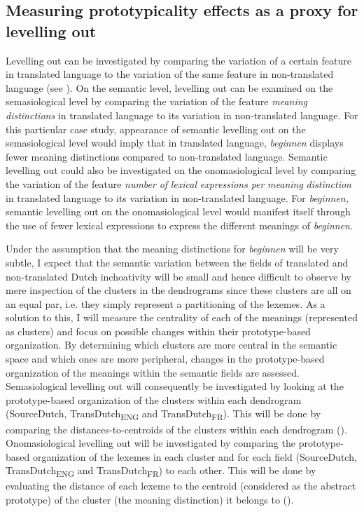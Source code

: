 \subsection{Measuring prototypicality effects as a proxy for levelling out}
\label{sec:3.8.1}
Levelling out can be investigated by comparing the variation of a certain feature in translated language to the variation of the same feature in non-translated language (see ). On the semantic level, levelling out can be examined on the semasiological level by comparing the variation of the feature \textit{meaning} \textit{distinctions} in translated language to its variation in non-translated language. For this particular case study, appearance of semantic levelling out on the semasiological level would imply that in translated language, \textit{beginnen} displays fewer meaning distinctions compared to non-translated language. Semantic levelling out could also be investigated on the onomasiological level by comparing the variation of the feature \textit{number} \textit{of} \textit{lexical} \textit{expressions} \textit{per} \textit{meaning} \textit{distinction} in translated language to its variation in non-translated language. For \textit{beginnen,} semantic levelling out on the onomasiological level would manifest itself through the use of fewer lexical expressions to express the different meanings of \textit{beginnen}.

Under the assumption that the meaning distinctions for \textit{beginnen} will be very subtle, I expect that the semantic variation between the fields of translated and non-translated Dutch inchoativity will be small and hence difficult to observe by mere inspection of the clusters in the dendrograms since these clusters are all on an equal par, i.e. they simply represent a partitioning of the lexemes. As a solution to this, I will measure the centrality of each of the meanings (represented as clusters) and focus on possible changes within their prototype-based organization. By determining which clusters are more central in the semantic space and which ones are more peripheral, changes in the prototype-based organization of the meanings within the semantic fields are assessed. Semasiological levelling out will consequently be investigated by looking at the prototype-based organization of the clusters within each dendrogram (SourceDutch, TransDutch\textsubscript{ENG} and TransDutch\textsubscript{FR}). This will be done by comparing the distances-to-centroids of the clusters within each dendrogram (). Onomasiological levelling out will be investigated by comparing the prototype-based organization of the lexemes in each cluster and for each field (SourceDutch, TransDutch\textsubscript{ENG} and TransDutch\textsubscript{FR}) to each other. This will be done by evaluating the distance of each lexeme to the centroid (considered as the abstract prototype) of the cluster (the meaning distinction) it belongs to ().

